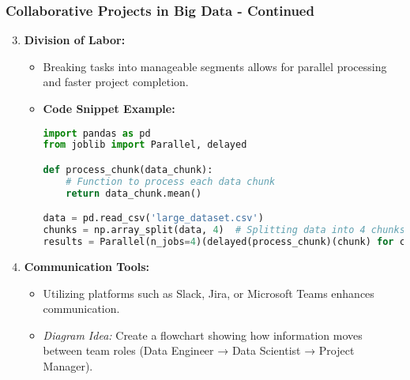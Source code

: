 \documentclass[aspectratio=169]{beamer}
\begin{document}
\begin{frame}[fragile]
    \frametitle{Collaborative Projects in Big Data - Continued}
    \begin{enumerate}
        \setcounter{enumi}{2} %
        \item \textbf{Division of Labor:}
        \begin{itemize}
            \item Breaking tasks into manageable segments allows for parallel processing and faster project completion.
            \item \textbf{Code Snippet Example:}
            \begin{lstlisting}[language=Python]
import pandas as pd
from joblib import Parallel, delayed

def process_chunk(data_chunk):
    # Function to process each data chunk
    return data_chunk.mean()

data = pd.read_csv('large_dataset.csv')
chunks = np.array_split(data, 4)  # Splitting data into 4 chunks
results = Parallel(n_jobs=4)(delayed(process_chunk)(chunk) for chunk in chunks)
            \end{lstlisting}
        \end{itemize}
        
        \item \textbf{Communication Tools:}
        \begin{itemize}
            \item Utilizing platforms such as Slack, Jira, or Microsoft Teams enhances communication.
            \item \textit{Diagram Idea:} Create a flowchart showing how information moves between team roles (Data Engineer → Data Scientist → Project Manager).
        \end{itemize}
    \end{enumerate}
\end{frame}
\end{document}

